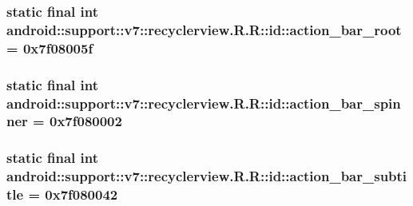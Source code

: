 \hypertarget{classandroid_1_1support_1_1v7_1_1recyclerview_1_1_r_1_1id_066184a9579c5fceab9150d1a7347c71}{
\subsubsection[{action\_\-bar\_\-root}]{\setlength{\rightskip}{0pt plus 5cm}static final int android::support::v7::recyclerview.R.R::id::action\_\-bar\_\-root = 0x7f08005f}}
\label{classandroid_1_1support_1_1v7_1_1recyclerview_1_1_r_1_1id_066184a9579c5fceab9150d1a7347c71}


\hypertarget{classandroid_1_1support_1_1v7_1_1recyclerview_1_1_r_1_1id_90816323f0b62af1443bde858ad1c9a1}{
\subsubsection[{action\_\-bar\_\-spinner}]{\setlength{\rightskip}{0pt plus 5cm}static final int android::support::v7::recyclerview.R.R::id::action\_\-bar\_\-spinner = 0x7f080002}}
\label{classandroid_1_1support_1_1v7_1_1recyclerview_1_1_r_1_1id_90816323f0b62af1443bde858ad1c9a1}


\hypertarget{classandroid_1_1support_1_1v7_1_1recyclerview_1_1_r_1_1id_95bc403ddab12c4bb66d37ba7033be9a}{
\subsubsection[{action\_\-bar\_\-subtitle}]{\setlength{\rightskip}{0pt plus 5cm}static final int android::support::v7::recyclerview.R.R::id::action\_\-bar\_\-subtitle = 0x7f080042}}
\label{classandroid_1_1support_1_1v7_1_1recyclerview_1_1_r_1_1id_95bc403ddab12c4bb66d37ba7033be9a}


